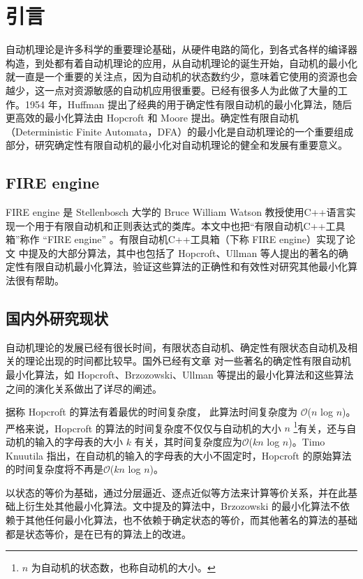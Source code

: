 \chapter{引言}
自动机理论是许多科学的重要理论基础，从硬件电路的简化，到各式各样的编译器构造，到处都有着自动机理论的应用，从自动机理论的诞生开始，自动机的最小化就一直是一个重要的关注点，因为自动机的状态数约少，意味着它使用的资源也会越少，这一点对资源敏感的自动机应用很重要。已经有很多人为此做了大量的工作。1954 年，Huffman 提出了经典的用于确定性有限自动机的最小化算法\cite{HUFFMAN1954161}，随后更高效的最小化算法由 Hopcroft 和 Moore 提出。确定性有限自动机（Deterministic Finite Automata，DFA）的最小化是自动机理论的一个重要组成部分，研究确定性有限自动机的最小化对自动机理论的健全和发展有重要意义。

\section{FIRE engine}
FIRE engine \cite{watson1994design}是 Stellenbosch 大学的 Bruce William Watson 教授使用C++语言实现一个用于有限自动机和正则表达式的类库。本文中也把“有限自动机C++工具箱”称作 “FIRE engine” 。有限自动机C++工具箱（下称 FIRE engine）实现了论文 \cite{watson1993taxonomya,watson1993taxonomyb} 中提及的大部分算法，其中也包括了 Hopcroft、Ullman 等人提出的著名的确定性有限自动机最小化算法，验证这些算法的正确性和有效性对研究其他最小化算法很有帮助。

\section{国内外研究现状}

自动机理论的发展已经有很长时间，有限状态自动机、确定性有限状态自动机及相关的理论出现的时间都比较早。国外已经有文章 \cite{watson1993taxonomyb} 对一些著名的确定性有限自动机最小化算法，如 Hopcroft、Brzozowski、Ullman 等提出的最小化算法和这些算法之间的演化关系做出了详尽的阐述。

据称 Hopcroft 的算法有着最优的时间复杂度， 此算法时间复杂度为 $\mathcal{O}$($n$ log $n$)\cite{Hopc71}。严格来说，Hopcroft 的算法的时间复杂度不仅仅与自动机的大小 $n$ \footnote{ $n$ 为自动机的状态数，也称自动机的大小。}有关，还与自动机的输入的字母表的大小 $k$ 有关，其时间复杂度应为$\mathcal{O}$($kn$ log $n$)。Timo Knuutila 指出，在自动机的输入的字母表的大小不固定时，Hopcroft 的原始算法的时间复杂度将不再是$\mathcal{O}$($kn$ log $n$)\cite{KNUUTILA2001333}。

以状态的等价为基础，通过分层逼近、逐点近似等方法来计算等价关系，并在此基础上衍生处其他最小化算法。文中提及的算法中，Brzozowski 的最小化算法不依赖于其他任何最小化算法，也不依赖于确定状态的等价，而其他著名的算法的基础都是状态等价，是在已有的算法上的改进\cite{watson1993taxonomyb}。

